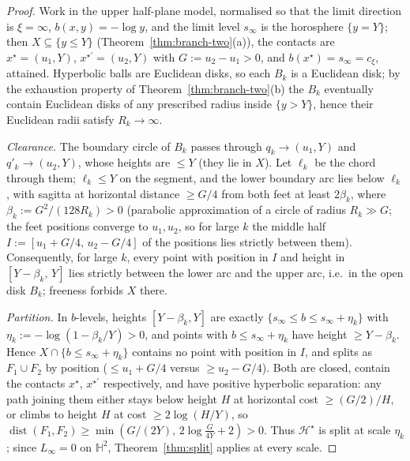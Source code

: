\documentclass[11pt]{article}
\theoremstyle{remark}
\newcommand{\X}{X}
\newcommand{\Hb}[1]{\mathcal{H}_{#1}}
\newcommand{\dist}{\operatorname{dist}}
\begin{document}
\begin{proof}
Work in the upper half-plane model, normalised so that the limit
direction is $\xi=\infty$, $b(x,y)=-\log y$, and the limit level
$s_{\infty}$ is the horosphere $\{y=Y\}$; then
$\X\subseteq\{y\le Y\}$ (Theorem~\ref{thm:branch-two}(a)), the
contacts are $x^{\star}=(u_{1},Y)$, $x^{\star\prime}=(u_{2},Y)$ with
$G:=u_{2}-u_{1}>0$, and $b(x^{\star})=s_{\infty}=c_{\xi}$, attained.
Hyperbolic balls are Euclidean disks, so each $B_{k}$ is a Euclidean
disk; by the exhaustion property of Theorem~\ref{thm:branch-two}(b)
the $B_{k}$ eventually contain Euclidean disks of any prescribed
radius inside $\{y>Y\}$, hence their Euclidean radii satisfy
$R_{k}\to\infty$.

\emph{Clearance.} The boundary circle of $B_{k}$ passes through
$q_{k}\to(u_{1},Y)$ and $q'_{k}\to(u_{2},Y)$, whose heights are
$\le Y$ (they lie in $\X$). Let $\ell_{k}$ be the chord through
them; $\ell_{k}\le Y$ on the segment, and the lower boundary arc lies
below $\ell_{k}$, with sagitta at horizontal distance $\ge G/4$ from
both feet at least $2\beta_{k}$, where
$\beta_{k}:=G^{2}/(128R_{k})>0$ (parabolic approximation of a circle
of radius $R_{k}\gg G$; the feet positions converge to $u_{1},u_{2}$,
so for large $k$ the middle half
$I:=[u_{1}+G/4,\,u_{2}-G/4]$ of the positions lies strictly between
them). Consequently, for large $k$, every point with position in $I$
and height in $[Y-\beta_{k},\,Y]$ lies strictly between the lower arc
and the upper arc, i.e.\ in the open disk $B_{k}$; freeness forbids
$\X$ there.

\emph{Partition.} In $b$-levels, heights $[Y-\beta_{k},Y]$ are
exactly $\{s_{\infty}\le b\le s_{\infty}+\eta_{k}\}$ with
$\eta_{k}:=-\log(1-\beta_{k}/Y)>0$, and points with $b\le
s_{\infty}+\eta_{k}$ have height $\ge Y-\beta_{k}$. Hence
$\X\cap\{b\le s_{\infty}+\eta_{k}\}$ contains no point with position
in $I$, and splits as $F_{1}\cup F_{2}$ by position ($\le u_{1}+G/4$
versus $\ge u_{2}-G/4$). Both are closed, contain the contacts
$x^{\star}$, $x^{\star\prime}$ respectively, and have positive
hyperbolic separation: any path joining them either stays below
height $H$ at horizontal cost $\ge(G/2)/H$, or climbs to height $H$
at cost $\ge2\log(H/Y)$, so
$\dist(F_{1},F_{2})\ge\min(G/(2Y),\,2\log\tfrac{G}{4Y}+2)>0$. Thus
$\Hb{}^{\star}$ is split at scale $\eta_{k}$; since
$L_{\infty}=0$ on $\mathbb{H}^{2}$, Theorem~\ref{thm:split} applies
at every scale.
\end{proof}
\end{document}
